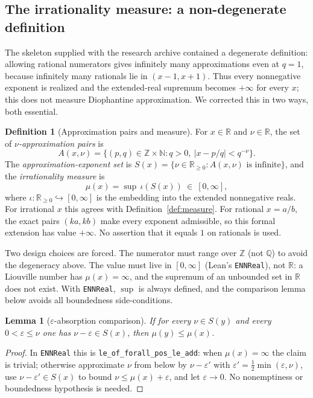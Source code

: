 \documentclass[11pt]{amsart}
\newtheorem{lemma}[theorem]{Lemma}
\theoremstyle{definition}
\newtheorem{definition}[theorem]{Definition}
\theoremstyle{remark}
\numberwithin{equation}{section}
\newcommand{\Q}{\mathbb{Q}}
\newcommand{\R}{\mathbb{R}}
\newcommand{\Z}{\mathbb{Z}}
\newcommand{\N}{\mathbb{N}}
\newcommand{\irr}{\mu}
\begin{document}
\subsection{The irrationality measure: a non-degenerate definition}\label{sec:lean-def}

The skeleton supplied with the research archive contained a degenerate definition: allowing rational numerators gives infinitely many approximations even at $q=1$, because infinitely many rationals lie in $(x-1,x+1)$. Thus every nonnegative exponent is realized and the extended-real supremum becomes $+\infty$ for every $x$; this does not measure Diophantine approximation. We corrected this in two ways, both essential.

\begin{definition}[Approximation pairs and measure]\label{def:lean-measure}
For $x\in\R$ and $\nu\in\R$, the set of \emph{$\nu$-approximation pairs} is
\[
A(x,\nu)=\{(p,q)\in\Z\times\N: q>0,\ |x-p/q|<q^{-\nu}\}.
\]
The \emph{approximation-exponent set} is $S(x)=\{\nu\in\R_{\ge0}: A(x,\nu)\text{ is infinite}\}$, and the \emph{irrationality measure} is
\[
\irr(x)=\sup\,\iota(S(x))\ \in\ [0,\infty],
\]
where $\iota:\R_{\ge0}\hookrightarrow[0,\infty]$ is the embedding into the extended nonnegative reals. For irrational $x$ this agrees with Definition~\ref{def:measure}. For rational $x=a/b$, the exact pairs $(ka,kb)$ make every exponent admissible, so this formal extension has value $+\infty$. No assertion that it equals $1$ on rationals is used.
\end{definition}

Two design choices are forced. The numerator must range over $\Z$ (not $\Q$) to avoid the degeneracy above. The value must live in $[0,\infty]$ (Lean's \texttt{ENNReal}), not $\R$: a Liouville number has $\irr(x)=\infty$, and the supremum of an unbounded set in $\R$ does not exist. With \texttt{ENNReal}, $\sup$ is always defined, and the comparison lemma below avoids all boundedness side-conditions.

\begin{lemma}[$\varepsilon$-absorption comparison]\label{lem:eps-abs}
If for every $\nu\in S(y)$ and every $0<\varepsilon\le\nu$ one has $\nu-\varepsilon\in S(x)$, then $\irr(y)\le\irr(x)$.
\end{lemma}
\begin{proof}
In \texttt{ENNReal} this is \texttt{le\_\allowbreak{}of\_\allowbreak{}forall\_\allowbreak{}pos\_\allowbreak{}le\_\allowbreak{}add}: when $\irr(x)=\infty$ the claim is trivial; otherwise approximate $\nu$ from below by $\nu-\varepsilon'$ with $\varepsilon'=\tfrac12\min(\varepsilon,\nu)$, use $\nu-\varepsilon'\in S(x)$ to bound $\nu\le\irr(x)+\varepsilon$, and let $\varepsilon\to0$. No nonemptiness or boundedness hypothesis is needed.
\end{proof}
\end{document}
